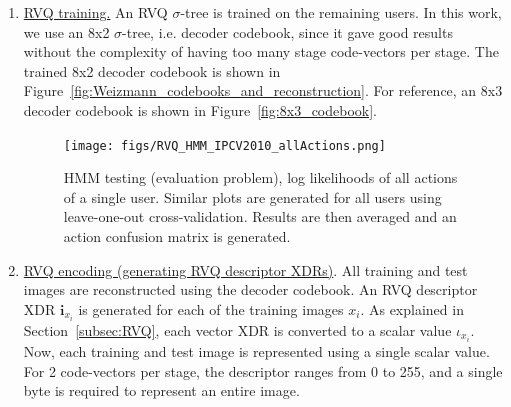 \begin{enumerate}
\item \underline{RVQ training.}  An RVQ $\sigma$-tree is trained on the remaining users.  In this work, we use an 8x2 $\sigma$-tree, i.e. decoder codebook, since it gave good results without the complexity of having too many stage code-vectors per stage.  The trained 8x2 decoder codebook is shown in Figure~\ref{fig:Weizmann_codebooks_and_reconstruction}.  For reference, an 8x3 decoder codebook is shown in Figure~\ref{fig:8x3_codebook}.  

								\begin{figure}[t]	
								\texttt{[image: figs/RVQ\_HMM\_IPCV2010\_allActions.png]}
								\caption{HMM testing (evaluation problem), log likelihoods of all actions of a single user.  Similar plots are generated for all users using leave-one-out cross-validation.  Results are then averaged and an action confusion matrix is generated.}
								\label{fig:RVQ_HMM_IPCV2010_allActions}
								\end{figure}

 
\item \underline{RVQ encoding (generating RVQ descriptor XDRs)}.  All training and test images are reconstructed using the decoder codebook.  An RVQ descriptor XDR $\mathbf{i}_{x_i}$ is generated for each of the training images $x_i$.  As explained in Section~\ref{subsec:RVQ}, each vector XDR is converted to a scalar value $\iota_{x_i}$.  Now, each training and test image is represented using a single scalar value.  For 2 code-vectors per stage, the descriptor ranges from 0 to 255, and a single byte is required to represent an entire image.  



\end{enumerate}
